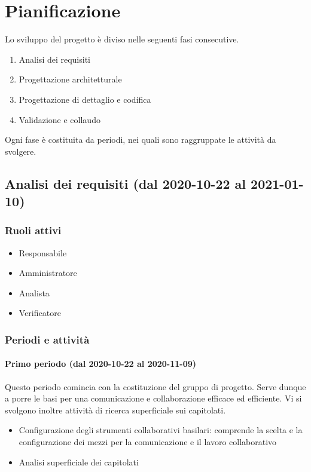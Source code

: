 \section{Pianificazione}
Lo sviluppo del progetto è diviso nelle seguenti fasi consecutive.
\begin{enumerate}
	\item Analisi dei requisiti
	\item Progettazione architetturale
	\item Progettazione di dettaglio e codifica
	\item Validazione e collaudo
\end{enumerate}
Ogni fase è costituita da periodi, nei quali sono raggruppate le attività da svolgere.

\subsection{Analisi dei requisiti (dal 2020-10-22 al 2021-01-10)}

\subsubsection{Ruoli attivi}
\begin{itemize}
	\item Responsabile
	\item Amministratore
	\item Analista
	\item Verificatore
\end{itemize}

\subsubsection{Periodi e attività}

\paragraph{Primo periodo (dal 2020-10-22 al 2020-11-09)}
Questo periodo comincia con la costituzione del gruppo di progetto. Serve dunque a porre le basi per una comunicazione e collaborazione efficace ed efficiente. Vi si svolgono inoltre attività di ricerca superficiale sui capitolati.

\begin{itemize}
	\item Configurazione degli strumenti collaborativi basilari: comprende la scelta e la configurazione dei mezzi per la comunicazione e il lavoro collaborativo
	\item Analisi superficiale dei capitolati
	
\end{itemize}

